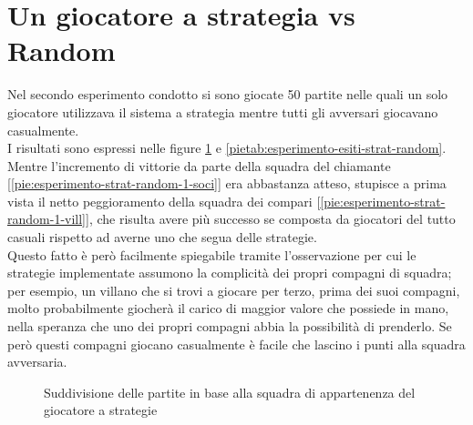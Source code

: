 \section{Un giocatore a strategia vs Random}

Nel secondo esperimento condotto si sono giocate 50 partite nelle quali un solo giocatore utilizzava il sistema a strategia mentre tutti gli avversari giocavano casualmente.\\
I risultati sono espressi nelle figure \ref{pietab:esperimento-esiti-strat-random-altro} e \ref{pietab:esperimento-esiti-strat-random}.\\
Mentre l'incremento di vittorie da parte della squadra del chiamante [\ref{pie:esperimento-strat-random-1-soci}] era abbastanza atteso, stupisce a prima vista il netto peggioramento della squadra dei compari [\ref{pie:esperimento-strat-random-1-vill}], che risulta avere più successo se composta da giocatori del tutto casuali rispetto ad averne uno che segua delle strategie.\\
Questo fatto è però facilmente spiegabile tramite l'osservazione per cui le strategie implementate assumono la complicità dei propri compagni di squadra; per esempio, un villano che si trovi a giocare per terzo, prima dei suoi compagni, molto probabilmente giocherà il carico di maggior valore che possiede in mano, nella speranza che uno dei propri compagni abbia la possibilità di prenderlo.
Se però questi compagni giocano casualmente è facile che lascino i punti alla squadra avversaria.


\begin{figure}[!htb]
\centering

\caption{Suddivisione delle partite in base alla squadra di appartenenza del giocatore a strategie} \label{pietab:esperimento-esiti-strat-random-altro}
\end{figure}


